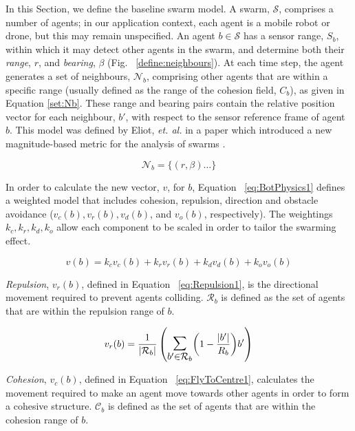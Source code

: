 \documentclass[letterpaper]{article}
\newcommand{\card}[1]{\vert{#1}\vert}
\newcommand{\magn}[1]{\vert{#1}\vert}
\begin{document}
In this Section, we define the baseline swarm model.  A swarm, $\mathcal S$,  comprises a number of agents; in our application context, each agent is a mobile robot or drone, but this may remain unspecified. An agent $b\in\mathcal S$  has a sensor range, $S_b$,  within which it may detect other agents in the swarm, and determine both their {\it range}, $r$, and {\it bearing}, $\beta$ (Fig. ~\ref{define:neighbours}).  At each time step, the agent generates a set of neighbours, $\mathcal N_b$, comprising other agents that are within a specific range (usually defined as the range of the cohesion field, $C_b$), as given in Equation \ref{set:Nb}. These range and bearing pairs contain the relative position vector for each neighbour, $b'$, with respect to the sensor reference frame of agent $b$. 
This model was defined by Eliot, {\it et. al.} in a paper which introduced a new magnitude-based metric for the analysis of swarms \cite{EKB:18}. 

\begin{equation}
\mathcal N_b = \{ (r,\beta) \ldots \}
\label{set:Nb}
\end{equation}

In order to calculate the new vector, $v$, for $b$, Equation ~\ref{eq:BotPhysics1} defines a weighted model that includes cohesion, repulsion, direction and obstacle avoidance ($v_c(b), v_r(b), v_d(b)$,  and $v_o(b)$, respectively). The weightings $k_c, k_r, k_d, k_o$ allow each component to be scaled in order to tailor the swarming effect. 

\begin{equation}\label{eq:BotPhysics1}
  v(b) = k_cv_c(b) + k_rv_r(b) + k_dv_d(b) + k_ov_o(b)
\end{equation}

\textit{Repulsion}, $v_r(b)$, defined in Equation ~\ref{eq:Repulsion1}, is the directional movement required to prevent agents colliding. $\mathcal R_b$ is defined as the set of agents that are within the repulsion range of $b$.

\begin{equation}\label{eq:Repulsion1}
v_r(b) = 
\frac{1}{\card{\mathcal R_b}}
\left(
	\mathlarger{\mathlarger{\sum_{b' \in \mathcal R_b}}}
	{\left( 1-\frac{\magn{b'}}{R_b} \right)}
	b'
\right)
\end{equation}

\textit{Cohesion}, $v_{c}(b)$, defined in Equation ~\ref{eq:FlyToCentre1}, calculates the movement required to make an agent move towards other agents in order to form a cohesive structure. $\mathcal C_b$ is defined as the set of agents that are within the cohesion range of $b$.
\end{document}
